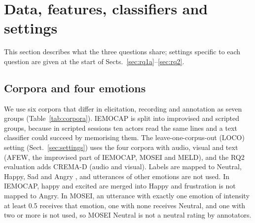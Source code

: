 \section{Data, features, classifiers and settings}\label{sec:setup}

This section describes what the three questions share; settings specific to each question are given at the start of Sects.~\ref{sec:rq1a}--\ref{sec:rq2}.

\subsection{Corpora and four emotions}
We use six corpora that differ in elicitation, recording and annotation as seven groups (Table~\ref{tab:corpora}). IEMOCAP \cite{busso2008iemocap} is split into improvised and scripted groups, because in scripted sessions ten actors read the same lines and a text classifier could succeed by memorising them. The leave-one-corpus-out (LOCO) setting (Sect.~\ref{sec:settings}) uses the four corpora with audio, visual and text (AFEW, the improvised part of IEMOCAP, MOSEI and MELD), and the RQ2 evaluation adds CREMA-D (audio and visual). Labels are mapped to Neutral, Happy, Sad and Angry \cite{ryumina2025}, and utterances of other emotions are not used. In IEMOCAP, happy and excited are merged into Happy and frustration is not mapped to Angry. In MOSEI, an utterance with exactly one emotion of intensity at least 0.5 receives that emotion, one with none receives Neutral, and one with two or more is not used, so MOSEI Neutral is not a neutral rating by annotators.

